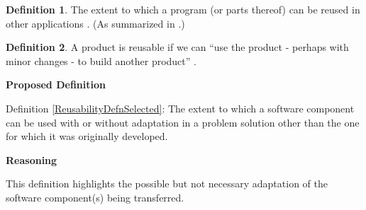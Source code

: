 \documentclass[letterpaper,cleveref]{lipics-v2019}
\theoremstyle{definition}
\newtheorem{defn}{Definition}
\begin{document}
\begin{defn}
	The extent to which a program (or parts thereof) can be reused in other
	applications \citep{McCallEtAl1977}. (As summarized in
	\citet{VanVliet2000}.)
\end{defn}

\begin{defn}
	A product is reusable if we can ``use the product - perhaps with minor changes -
	to build another product'' \citep{ghezzi1991fundamentals}.
\end{defn}

\noindent \textbf{Proposed Definition}

Definition \ref{ReusabilityDefnSelected}: The extent to which a software
component can be used with or without adaptation in a problem solution other
than the one for which it was originally developed.

\noindent \textbf{Reasoning}

This definition highlights the possible but not necessary adaptation of the
software component(s) being transferred.
\end{document}
